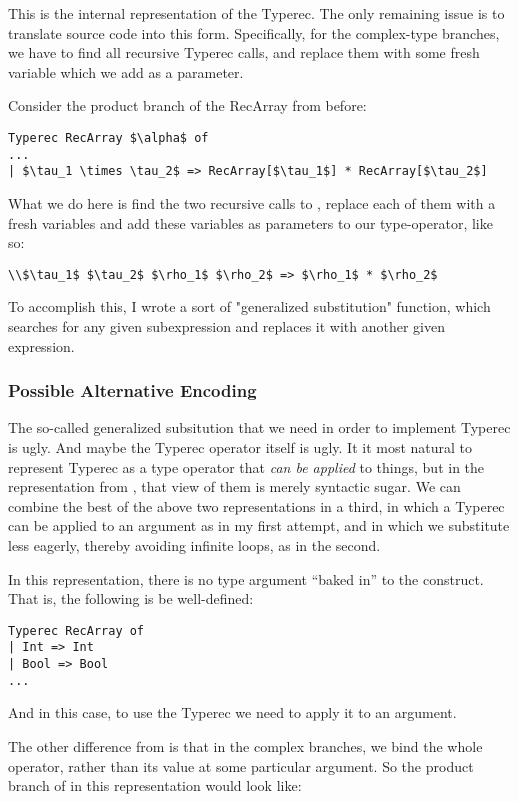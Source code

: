 \documentclass[pageno]{jpaper}
\begin{document}
{{{This is the internal representation of the Typerec. The only remaining issue is to translate source code
into this form. Specifically, for the complex-type branches, we have to find all recursive Typerec calls,
and replace them with some fresh variable which we add as a parameter.

Consider the product branch of the RecArray  from before:
\begin{lstlisting}[mathescape]
Typerec RecArray $\alpha$ of
...
| $\tau_1 \times \tau_2$ => RecArray[$\tau_1$] * RecArray[$\tau_2$]
\end{lstlisting}
What we do here is find the two recursive calls to , replace each of them with a fresh variables and add these variables as parameters to our type-operator, like so:
\begin{lstlisting}[mathescape]
\\$\tau_1$ $\tau_2$ $\rho_1$ $\rho_2$ => $\rho_1$ * $\rho_2$
\end{lstlisting}

To accomplish this, I wrote a sort of "generalized substitution" function, which searches for any given subexpression and replaces it with another given expression.

\subsubsection{Possible Alternative Encoding}
The so-called generalized subsitution that we need in order to implement Typerec is ugly.
And maybe the Typerec operator itself is ugly. It it most natural to represent Typerec as a type operator
that \textit{can be applied} to things, but in the representation from \cite{harper-typecase}, that view of them is merely syntactic sugar.
We can combine the best of the above two representations in a third, in which a Typerec can be applied to
an argument as in my first attempt, and in which we substitute less eagerly, thereby avoiding infinite loops,
as in the second.

In this representation, there is no type argument ``baked in'' to the construct.
That is, the following is be well-defined:

\begin{lstlisting}[mathescape]
Typerec RecArray of
| Int => Int
| Bool => Bool
...
\end{lstlisting}

And in this case, to use the Typerec we need to apply it to an argument.

The other difference from \cite{harper-typecase} is that in the complex branches, we bind the whole
operator, rather than its value at some particular argument.
So the product branch of  in this representation would look like:

}}}
\end{document}
